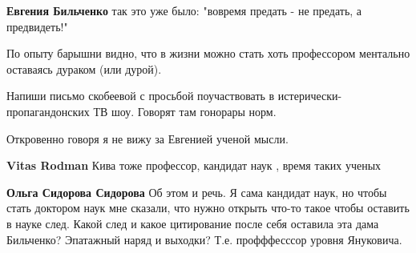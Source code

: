 \begin{itemize}
\begin{itemize}
 
\textbf{Евгения Бильченко} так это уже было: "вовремя предать - не предать, а предвидеть!"
\end{itemize}

 

По опыту барышни видно, что в жизни можно стать хоть профессором ментально
оставаясь дураком (или дурой).

Напиши письмо скобеевой с просьбой поучаствовать в истерически-пропагандонских
ТВ шоу. Говорят там гонорары норм.

\begin{itemize}
 
Откровенно говоря я не вижу за Евгенией ученой мысли.

 
\textbf{Vitas Rodman} Кива тоже профессор, кандидат наук , время таких ученых

 
\textbf{Ольга Сидорова Сидорова} Об этом и речь. Я сама кандидат наук, но чтобы
стать доктором наук мне сказали, что нужно открыть что-то такое чтобы оставить
в науке след. Какой след и какое цитирование после себя оставила эта дама
Бильченко? Эпатажный наряд и выходки? Т.е. профффесссор уровня Януковича.
\end{itemize}


\end{itemize}
